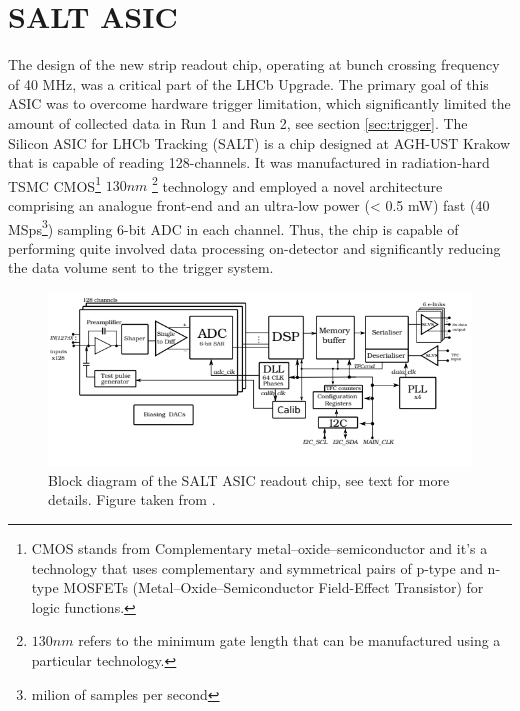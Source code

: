  \section{SALT ASIC}
 \label{sec:salt}
The design of the new strip readout chip, operating at bunch crossing frequency of 40 MHz, was a critical part of the LHCb Upgrade. The primary goal of this ASIC was to overcome hardware trigger limitation, which significantly limited the amount of collected data in Run 1 and Run 2, see section \ref{sec:trigger}. 
The Silicon ASIC for LHCb Tracking (SALT) is a chip designed at AGH-UST Krakow that is capable of reading 128-channels. It was manufactured in radiation-hard TSMC CMOS\footnote{CMOS stands from Complementary metal–oxide–semiconductor and it's a technology that uses complementary and symmetrical pairs of p-type and n-type  MOSFETs (Metal–Oxide–Semiconductor Field-Effect Transistor) for logic functions.} $130 nm$ \footnote{$130 nm$ refers to the minimum gate length that can be manufactured using a particular technology. } technology and employed a novel architecture comprising an analogue front-end and an ultra-low power (< 0.5 mW) fast (40 MSps\footnote{milion of samples per second}) sampling 6-bit ADC in each channel. Thus, the chip is capable of performing quite involved data processing on-detector and significantly reducing the data volume sent to the trigger system.


\begin{figure}[ht!]
\centering
\includegraphics{figures/SALT_2.PNG}
\caption{Block diagram of the SALT ASIC readout chip, see text for more details. Figure taken from \cite{SALT}.
\label{fig:SALT}}
\end{figure}



